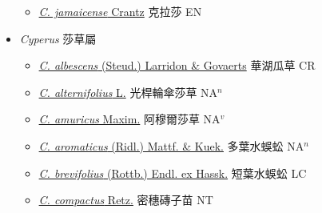 \begin{itemize}
  \begin{itemize}
        \item[] \href{http://www.theplantlist.org/tpl1.1/search?q=Cladium+jamaicense}{\textit{C. jamaicense} Crantz}   克拉莎 EN
  \end{itemize}
 \item[] \textit{Cyperus} 莎草屬
                    
  \begin{itemize}
        \item[] \href{http://www.theplantlist.org/tpl1.1/search?q=Cyperus+albescens}{\textit{C. albescens} (Steud.) Larridon \& Govaerts}     華湖瓜草 CR
        \item[] \href{http://www.theplantlist.org/tpl1.1/search?q=Cyperus+alternifolius}{\textit{C. alternifolius} L.}   光桿輪傘莎草 NA$^n$
        \item[] \href{http://www.theplantlist.org/tpl1.1/search?q=Cyperus+amuricus}{\textit{C. amuricus} Maxim.}   阿穆爾莎草 NA$^v$
        \item[] \href{http://www.theplantlist.org/tpl1.1/search?q=Cyperus+aromaticus}{\textit{C. aromaticus} (Ridl.) Mattf. \& Kuek.}     多葉水蜈蚣 NA$^n$
        \item[] \href{http://www.theplantlist.org/tpl1.1/search?q=Cyperus+brevifolius}{\textit{C. brevifolius} (Rottb.) Endl. ex Hassk.}     短葉水蜈蚣 LC
        \item[] \href{http://www.theplantlist.org/tpl1.1/search?q=Cyperus+compactus}{\textit{C. compactus} Retz.}     密穗磚子苗 NT

\end{itemize}
\end{itemize}
